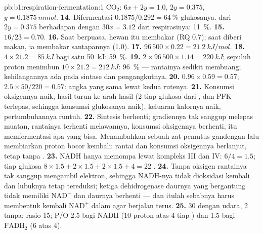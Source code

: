 \begin{solution}{pb:b1:respiration-fermentation:1}
$\mathrm{CO_2}$: $6x + 2y = 1.0$, $2y = 0.375$, $y = \qty{0.1875}{mmol}$.
\textbf{14.} Difermentasi $0.1875/0.292 = \qty{64}{\%}$ glukosanya. 
dari  $2y = 0.375$ berhadapan dengan $30x = 3.12$ dari
respirasinya:
\qty{11}{\%}.
\textbf{15.} $16/23 = 0.70$.
\textbf{16.} Saat berpuasa, hewan itu membakar  (RQ 0.7); saat
diberi makan, ia membakar  santapannya (1.0).
\textbf{17.} $96\,500\times 0.22 = \qty{21.2}{kJ/mol}$.
\textbf{18.} $4\times 21.2 = \qty{85}{kJ}$ bagi satu  \qty{50}{kJ}:
\qty{59}{\%}.
\textbf{19.} $2\times 96\,500\times 1.14 = \qty{220}{kJ}$; sepuluh
proton menimbun $10\times 21.2 = \qty{212}{kJ}$: \qty{96}{\%} ---
rantainya sedikit membuang; kehilangannya ada pada sintase dan
pengangkutnya.
\textbf{20.} $0.96\times 0.59 = 0.57$; $2.5\times 50/220 = 0.57$: angka
yang sama lewat kedua rutenya.
\textbf{21.} Konsumsi oksigennya naik, hasil  turun ke arah
hasil  (2 tiap glukosa dari , dan PFK terlepas,
sehingga konsumsi glukosanya naik), keluaran kalornya naik,
pertumbuhannya runtuh.
\textbf{22.} Sintesis  berhenti; gradiennya tak sanggup melepas
muatan, rantainya terhenti melawannya, konsumsi oksigennya berhenti,
 itu memfermentasi apa yang bisa. Menambahkan sebuah zat pemutus
gandengan lalu membiarkan proton bocor kembali: rantai dan konsumsi
oksigennya berlanjut, tetap tanpa .
\textbf{23.} NADH hanya memompa lewat kompleks III dan IV: $6/4 = 1.5$;
tiap glukosa $8\times 1.5 + 2\times 1.5 + 2\times 1.5 + 4 = 22$ .
\textbf{24.} Tanpa oksigen rantainya tak sanggup mengambil elektron,
sehingga NADH-nya tidak dioksidasi kembali dan lubuknya tetap
tereduksi; ketiga dehidrogenase daurnya yang bergantung  tidak
memiliki $\mathrm{NAD^+}$ dan daurnya berhenti --- dan itulah sebabnya
 harus membentuk kembali $\mathrm{NAD^+}$ dalam 
agar  berjalan terus.
\textbf{25.} 30  dengan udara, 2 tanpa: rasio 15; P/O 2.5 bagi NADH
(10 proton atas 4 tiap ) dan 1.5 bagi $\mathrm{FADH_2}$ (6 atas
4).
\end{solution}

